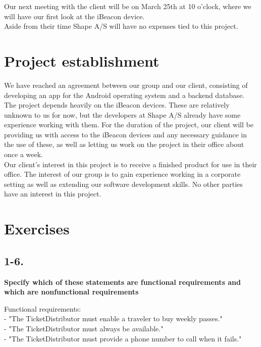 \documentclass[12pt]{article}
\begin{document}
Our next meeting with the client will be on March 25th at 10 o'clock, where we will have our first look at the iBeacon device.\\

Aside from their time Shape A/S will have no expenses tied to this project.










\section{Project establishment}

We have reached an agreement between our group and our client, consisting of developing an app for the Android operating system and a backend database.\\

The project depends heavily on the iBeacon devices. These are relatively unknown to us for now, but the developers at Shape A/S already have some experience working with them. For the duration of the project, our client will be providing us with access to the iBeacon devices and any necessary guidance in the use of these, as well as letting us work on the project in their office about once a week.\\

Our client's interest in this project is to receive a finished product for use in their office. The interest of our group is to gain experience working in a corporate setting as well as extending our software development skills. No other parties have an interest in this project.\\












\newpage
\section{Exercises}

\subsection{1-6.}
\textbf{Specify which of these statements are functional requirements and which are
nonfunctional requirements}

Functional requirements:\\
- "The TicketDistributor must enable a traveler to buy weekly passes."\\
- "The TicketDistributor must always be available."\\
- "The TicketDistributor must provide a phone number to call when it fails."\\
\end{document}
